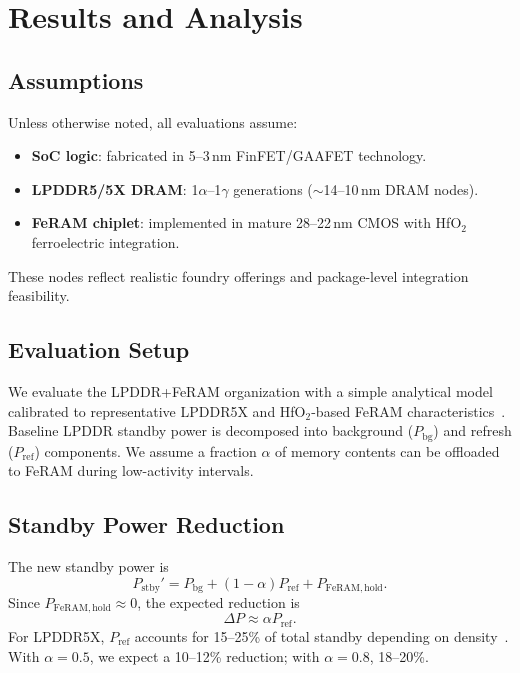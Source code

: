 \section{Results and Analysis}

\subsection{Assumptions}
Unless otherwise noted, all evaluations assume:
\begin{itemize}
  \item \textbf{SoC logic}: fabricated in 5--3\,nm FinFET/GAAFET technology.
  \item \textbf{LPDDR5/5X DRAM}: 1$\alpha$--1$\gamma$ generations ($\sim$14--10\,nm DRAM nodes).
  \item \textbf{FeRAM chiplet}: implemented in mature 28--22\,nm CMOS with HfO$_2$ ferroelectric integration.
\end{itemize}
These nodes reflect realistic foundry offerings and package-level integration feasibility.

\subsection{Evaluation Setup}
We evaluate the LPDDR+FeRAM organization with a simple analytical model calibrated to representative LPDDR5X
and HfO$_2$-based FeRAM characteristics~\cite{ChoiIEDM2022,KimIEDM2021}.
Baseline LPDDR standby power is decomposed into background ($P_{\mathrm{bg}}$) and refresh ($P_{\mathrm{ref}}$) components.
We assume a fraction $\alpha$ of memory contents can be offloaded to FeRAM during low-activity intervals.

\subsection{Standby Power Reduction}
The new standby power is
\[
P_{\mathrm{stby}}' = P_{\mathrm{bg}} + (1-\alpha) P_{\mathrm{ref}} + P_{\mathrm{FeRAM,hold}}.
\]
Since $P_{\mathrm{FeRAM,hold}} \approx 0$, the expected reduction is
\[
\Delta P \approx \alpha P_{\mathrm{ref}}.
\]
For LPDDR5X, $P_{\mathrm{ref}}$ accounts for 15--25\% of total standby depending on density~\cite{ChoiIEDM2022}.
With $\alpha=0.5$, we expect a 10--12\% reduction; with $\alpha=0.8$, 18--20\%.

